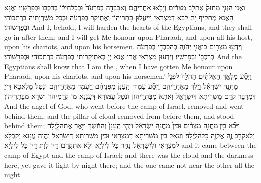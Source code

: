 {וַאֲנִ֗י הִנְנִ֤י מְחַזֵּק֙ אֶת\maqqaf לֵ֣ב מִצְרַ֔יִם וְיָבֹ֖אוּ אַחֲרֵיהֶ֑ם וְאִכָּבְדָ֤ה בְּפַרְעֹה֙ וּבְכׇל\maqqaf חֵיל֔וֹ בְּרִכְבּ֖וֹ וּבְפָרָשָֽׁיו׃}
{וַאֲנָא הָאֲנָא מְתַקֵּיף יָת לִבָּא דְּמִצְרָאֵי וְיֵיעֲלוּן בָּתְרֵיהוֹן וְאֶתְיַקַּר בְּפַרְעֹה וּבְכָל מַשְׁרְיָתֵיהּ בִּרְתִכּוֹהִי וּבְפָרָשׁוֹהִי׃}
{And I, behold, I will harden the hearts of the Egyptians, and they shall go in after them; and I will get Me honour upon Pharaoh, and upon all his host, upon his chariots, and upon his horsemen.}{}
{וְיָדְע֥וּ מִצְרַ֖יִם כִּי\maqqaf אֲנִ֣י יְהֹוָ֑ה בְּהִכָּבְדִ֣י בְּפַרְעֹ֔ה בְּרִכְבּ֖וֹ וּבְפָרָשָֽׁיו׃}
{וְיִדְּעוּן מִצְרָאֵי אֲרֵי אֲנָא יְיָ בְּאִתְיַקָּרוּתִי בְּפַרְעֹה בִּרְתִכּוֹהִי וּבְפָרָשׁוֹהִי׃}
{And the Egyptians shall know that I am the \lord, when I have gotten Me honour upon Pharaoh, upon his chariots, and upon his horsemen.’}{}
{וַיִּסַּ֞ע מַלְאַ֣ךְ הָאֱלֹהִ֗ים הַהֹלֵךְ֙ לִפְנֵי֙ מַחֲנֵ֣ה יִשְׂרָאֵ֔ל וַיֵּ֖לֶךְ מֵאַחֲרֵיהֶ֑ם וַיִּסַּ֞ע עַמּ֤וּד הֶֽעָנָן֙ מִפְּנֵיהֶ֔ם וַיַּֽעֲמֹ֖ד מֵאַחֲרֵיהֶֽם׃}
{וּנְטַל מַלְאֲכָא דַּייָ דִּמְדַבַּר קֳדָם מַשְׁרִיתָא דְּיִשְׂרָאֵל וַאֲתָא מִבָּתְרֵיהוֹן וּנְטַל עַמּוּדָא דַּעֲנָנָא מִן קֳדָמֵיהוֹן וּשְׁרָא מִבָּתְרֵיהוֹן׃}
{And the angel of God, who went before the camp of Israel, removed and went behind them; and the pillar of cloud removed from before them, and stood behind them;}{}
{וַיָּבֹ֞א בֵּ֣ין \legarmeh  מַחֲנֵ֣ה מִצְרַ֗יִם וּבֵין֙ מַחֲנֵ֣ה יִשְׂרָאֵ֔ל וַיְהִ֤י הֶֽעָנָן֙ וְהַחֹ֔שֶׁךְ וַיָּ֖אֶר אֶת\maqqaf הַלָּ֑יְלָה וְלֹא\maqqaf קָרַ֥ב זֶ֛ה אֶל\maqqaf זֶ֖ה כׇּל\maqqaf הַלָּֽיְלָה׃}
{וְעָאל בֵּין מַשְׁרִיתָא דְּמִצְרָאֵי וּבֵין מַשְׁרִיתָא דְּיִשְׂרָאֵל וַהֲוָה עֲנָנָא וְקַבְלָא לְמִצְרָאֵי וּלְיִשְׂרָאֵל נָהַר כָּל לֵילְיָא וְלָא אִתְקָרַבוּ דֵין לְוָת דֵּין כָּל לֵילְיָא׃}
{and it came between the camp of Egypt and the camp of Israel; and there was the cloud and the darkness here, yet gave it light by night there; and the one came not near the other all the night.}{}
